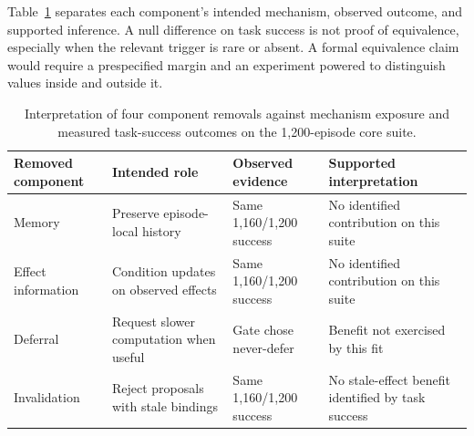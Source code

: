 \documentclass[11pt]{article}
\begin{document}
Table~\ref{tab:component-interpretation} separates each component's intended mechanism, observed outcome, and supported inference. A null difference on task success is not proof of equivalence, especially when the relevant trigger is rare or absent. A formal equivalence claim would require a prespecified margin and an experiment powered to distinguish values inside and outside it.
\begin{table}[ht]
\centering\small
\caption{Interpretation of four component removals against mechanism exposure and measured task-success outcomes on the 1,200-episode core suite.}
\label{tab:component-interpretation}
\begin{tabular}{p{.20\linewidth}p{.24\linewidth}p{.22\linewidth}p{.22\linewidth}}\toprule
Removed component & Intended role & Observed evidence & Supported interpretation \\\midrule
Memory & Preserve episode-local history & Same 1,160/1,200 success & No identified contribution on this suite \\
Effect information & Condition updates on observed effects & Same 1,160/1,200 success & No identified contribution on this suite \\
Deferral & Request slower computation when useful & Gate chose never-defer & Benefit not exercised by this fit \\
Invalidation & Reject proposals with stale bindings & Same 1,160/1,200 success & No stale-effect benefit identified by task success \\\bottomrule
\end{tabular}
\end{table}
\end{document}
